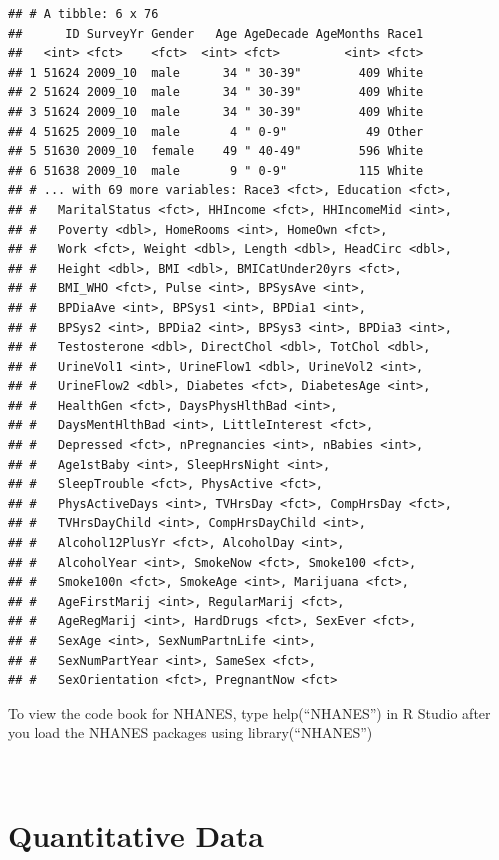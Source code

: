\documentclass[
]{book}
\begin{document}
\begin{verbatim}
## # A tibble: 6 x 76
##      ID SurveyYr Gender   Age AgeDecade AgeMonths Race1
##   <int> <fct>    <fct>  <int> <fct>         <int> <fct>
## 1 51624 2009_10  male      34 " 30-39"        409 White
## 2 51624 2009_10  male      34 " 30-39"        409 White
## 3 51624 2009_10  male      34 " 30-39"        409 White
## 4 51625 2009_10  male       4 " 0-9"           49 Other
## 5 51630 2009_10  female    49 " 40-49"        596 White
## 6 51638 2009_10  male       9 " 0-9"          115 White
## # ... with 69 more variables: Race3 <fct>, Education <fct>,
## #   MaritalStatus <fct>, HHIncome <fct>, HHIncomeMid <int>,
## #   Poverty <dbl>, HomeRooms <int>, HomeOwn <fct>,
## #   Work <fct>, Weight <dbl>, Length <dbl>, HeadCirc <dbl>,
## #   Height <dbl>, BMI <dbl>, BMICatUnder20yrs <fct>,
## #   BMI_WHO <fct>, Pulse <int>, BPSysAve <int>,
## #   BPDiaAve <int>, BPSys1 <int>, BPDia1 <int>,
## #   BPSys2 <int>, BPDia2 <int>, BPSys3 <int>, BPDia3 <int>,
## #   Testosterone <dbl>, DirectChol <dbl>, TotChol <dbl>,
## #   UrineVol1 <int>, UrineFlow1 <dbl>, UrineVol2 <int>,
## #   UrineFlow2 <dbl>, Diabetes <fct>, DiabetesAge <int>,
## #   HealthGen <fct>, DaysPhysHlthBad <int>,
## #   DaysMentHlthBad <int>, LittleInterest <fct>,
## #   Depressed <fct>, nPregnancies <int>, nBabies <int>,
## #   Age1stBaby <int>, SleepHrsNight <int>,
## #   SleepTrouble <fct>, PhysActive <fct>,
## #   PhysActiveDays <int>, TVHrsDay <fct>, CompHrsDay <fct>,
## #   TVHrsDayChild <int>, CompHrsDayChild <int>,
## #   Alcohol12PlusYr <fct>, AlcoholDay <int>,
## #   AlcoholYear <int>, SmokeNow <fct>, Smoke100 <fct>,
## #   Smoke100n <fct>, SmokeAge <int>, Marijuana <fct>,
## #   AgeFirstMarij <int>, RegularMarij <fct>,
## #   AgeRegMarij <int>, HardDrugs <fct>, SexEver <fct>,
## #   SexAge <int>, SexNumPartnLife <int>,
## #   SexNumPartYear <int>, SameSex <fct>,
## #   SexOrientation <fct>, PregnantNow <fct>
\end{verbatim}

To view the code book for NHANES, type help(``NHANES'') in R Studio after you load the NHANES packages using library(``NHANES'')

\emph{\\
}

\hypertarget{quantitative-data}{%
\section{Quantitative Data}\label{quantitative-data}}
\end{document}
